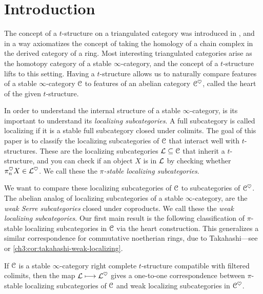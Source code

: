 

\section{Introduction}

The concept of a $t$-structure on a triangulated category was introduced in \cite{beilinson-bernstein-deligne_1983}, and in a way axiomatizes the concept of taking the homology of a chain complex in the derived category of a ring. Most interesting triangulated categories arise as the homotopy category of a stable $\infty$-category, and the concept of a $t$-structure lifts to this setting. Having a $t$-structure allows us to naturally compare features of a stable $\infty$-category $\EuScript{C}$ to features of an abelian category $\EuScript{C}^\heartsuit$, called the heart of the given $t$-structure. 

In order to understand the internal structure of a stable $\infty$-category, is its important to understand its \emph{localizing subcategories}. A full subcategory is called localizing if it is a stable full subcategory closed under colimits. The goal of this paper is to classify the localizing subcategories of $\EuScript{C}$ that interact well with $t$-structures. These are the localizing subcategories $\mathcal{L}\subseteq \EuScript{C}$ that inherit a $t$-structure, and you can check if an object $X$ is in $\mathcal{L}$ by checking whether $\pi_n^\heartsuit X\in \mathcal{L}^\heartsuit$. We call these the \emph{$\pi$-stable localizing subcategories}.

We want to compare these localizing subcategories of $\EuScript{C}$ to subcategories of $\EuScript{C}^\heartsuit$. The abelian analog of localizing subcategories of a stable $\infty$-category, are the \emph{weak Serre subcategories} closed under coproducts. We call these the \emph{weak localizing subcategories}. Our first main result is the following classification of $\pi$-stable localizing subcategories in $\EuScript{C}$ via the heart construction. This generalizes a similar correspondence for commutative noetherian rings, due to Takahashi---see \cite{takahashi_2009} or \cref{ch3:cor:takahashi-weak-localizing}. 

\begin{introthm}
    \label{ch3:thm:A}
    If $\EuScript{C}$ is a stable $\infty$-category right complete $t$-structure compatible with filtered colimits, then the map $\mathcal{L}\longmapsto \mathcal{L}^\heartsuit$ gives a one-to-one correspondence between $\pi$-stable localizing subcategories of $\EuScript{C}$ and weak localizing subcategories in $\EuScript{C}^\heartsuit$.
\end{introthm}

